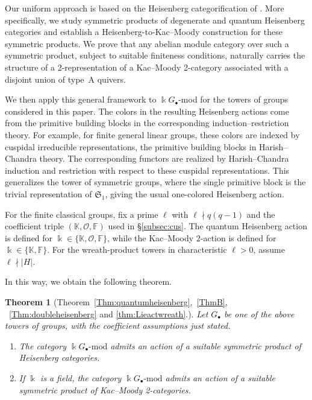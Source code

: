 \documentclass[12pt]{amsart}
\numberwithin{itemcounter}{subsection}
\theoremstyle{plain}
\newtheorem{theorem}{Theorem}[section]
\theoremstyle{definition}
\theoremstyle{remark}
\numberwithin{equation}{section}
\def\k{\Bbbk}
\begin{document}
Our uniform approach is based on the Heisenberg categorification of \cite{BSW20a}.  More specifically, we study symmetric products of degenerate and quantum Heisenberg categories and establish a Heisenberg-to-Kac--Moody construction for these symmetric products.  We prove that any abelian module category over such a symmetric product, subject to suitable finiteness conditions, naturally carries the structure of a 2-representation of a Kac--Moody 2-category associated with a disjoint union of type~A quivers.

We then apply this general framework to \(\k G_\bullet\)-mod for the towers of groups considered in this paper. The colors in the resulting Heisenberg actions come from the primitive building blocks in the corresponding induction--restriction theory. For example, for finite general linear groups, these colors are indexed by cuspidal irreducible representations, the primitive building blocks in Harish--Chandra theory. The corresponding functors are realized by Harish--Chandra induction and restriction with respect to these cuspidal representations. This generalizes the tower of symmetric groups, where the single primitive block is the trivial representation of \(\mathfrak S_1\), giving the usual one-colored Heisenberg action.


For the finite classical groups, fix a prime $\ell$ with $\ell\nmid q(q-1)$ and the coefficient triple $(\mathbb K,\mathcal O,\mathbb F)$ used in \S\ref{subsec:cus}. The quantum Heisenberg action is defined for $\k\in\{\mathbb K,\mathcal O,\mathbb F\}$, while the Kac--Moody $2$-action is defined for $\k\in\{\mathbb K,\mathbb F\}$. For the wreath-product towers in characteristic $\ell>0$, assume $\ell\nmid |H|$.


In this way, we obtain the following theorem.
\begin{theorem}[Theorem~\ref{Thm:quantumheisenberg},~\ref{ThmB}, ~\ref{Thm:doubleheisenberg} and \ref{thm:Lieactwreath}.]
\label{introthm1}
Let $G_\bullet$ be one of the above towers of groups, with the coefficient assumptions just stated.
\begin{enumerate}
    \item The category $\k G_\bullet\text{-mod}$ admits an action of a
    suitable symmetric product of Heisenberg categories.

    \item If $\k$ is a field, the category $\k G_\bullet\text{-mod}$ admits an action of a
    suitable symmetric product of Kac--Moody 2-categories.
\end{enumerate}
\end{theorem}
\end{document}
